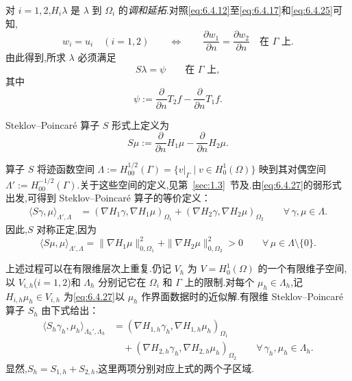 对 \(i=1,2\),\(H_i\lambda\) 是 \(\lambda\) 到 \(\Omega_i\) 的\emph{调和延拓}.对照\eqref{eq:6.4.12}至\eqref{eq:6.4.17}和\eqref{eq:6.4.25}可知,
\begin{equation}\label{eq:6.4.29}
  w_i=u_i\quad(i=1,2)\qquad
  \Longleftrightarrow\qquad
  \frac{\partial w_1}{\partial n}=\frac{\partial w_2}{\partial n}
      \quad\text{在 }\Gamma\text{ 上}.
\end{equation}
由此得到,所求 \(\lambda\) 必须满足
\begin{equation}\label{eq:6.4.30}
  S\lambda=\psi\qquad\text{在 }\Gamma\text{ 上},
\end{equation}
其中
\begin{equation}\label{eq:6.4.31}
  \psi:=\frac{\partial}{\partial n}T_2f-\frac{\partial}{\partial n}T_1f.
\end{equation}
\begin{definition*}
Steklov--Poincaré 算子 \(S\) 形式上定义为
\begin{equation}\label{eq:6.4.32}
  S\mu:=\frac{\partial}{\partial n}H_1\mu-\frac{\partial}{\partial n}H_2\mu.
\end{equation}
\end{definition*}

算子 \(S\) 将迹函数空间 \(\Lambda:=H_{00}^{1/2}(\Gamma)=\{v|_\Gamma\mid v\in H_0^1(\Omega)\}\) 映到其对偶空间 \(\Lambda':=H_{00}^{-1/2}(\Gamma)\).关于这些空间的定义,见第~\ref{sec:1.3}~节及.由\eqref{eq:6.4.27}的弱形式出发,可得到 Steklov--Poincaré 算子的等价定义：
\begin{equation}\label{eq:6.4.33}
  \begin{aligned}
    \langle S\gamma,\mu\rangle_{\Lambda',\Lambda}
      &=(\nabla H_1\gamma,\nabla H_1\mu)_{\Omega_1}
       +(\nabla H_2\gamma,\nabla H_2\mu)_{\Omega_2}
       \qquad\forall\,\gamma,\mu\in\Lambda .
  \end{aligned}
\end{equation}
因此,\(S\) 对称正定,因为
\[
  \langle S\mu,\mu\rangle_{\Lambda',\Lambda}
     =\|\nabla H_1\mu\|_{0,\Omega_1}^2+\|\nabla H_2\mu\|_{0,\Omega_2}^2>0
     \qquad\forall\,\mu\in\Lambda\setminus\{0\}.
\]

上述过程可以在有限维层次上重复.仍记 \(V_h\) 为 \(V=H_0^1(\Omega)\) 的一个有限维子空间,以 \(V_{i,h}\)(\(i=1,2\))和 \(\Lambda_h\) 分别记它在 \(\Omega_i\) 和 \(\Gamma\) 上的限制.对每个 \(\mu_h\in\Lambda_h\),记 \(H_{i,h}\mu_h\in V_{i,h}\) 为\eqref{eq:6.4.27}以 \(\mu_h\) 作界面数据时的近似解.有限维 Steklov--Poincaré 算子 \(S_h\) 由下式给出：
\begin{equation}\label{eq:6.4.34}
  \begin{aligned}
    \langle S_h\gamma_h,\mu_h\rangle_{\Lambda_h',\Lambda_h}
      &=(\nabla H_{1,h}\gamma_h,\nabla H_{1,h}\mu_h)_{\Omega_1}\\
      &\quad+(\nabla H_{2,h}\gamma_h,\nabla H_{2,h}\mu_h)_{\Omega_2}
       \qquad\forall\,\gamma_h,\mu_h\in\Lambda_h.
  \end{aligned}
\end{equation}
显然,\(S_h=S_{1,h}+S_{2,h}\),这里两项分别对应上式的两个子区域.

